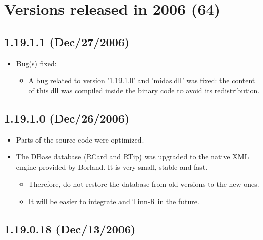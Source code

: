 
\section{Versions released in 2006 (64)}
\subsection{1.19.1.1 (Dec/27/2006)}

\begin{itemize}
  \item Bug(s) fixed:
    \begin{itemize}
      \item A bug related to version '1.19.1.0' and 'midas.dll' was fixed:
        the content of this dll was compiled inside the binary code to avoid
        its redistribution.
    \end{itemize}
\end{itemize}


\subsection{1.19.1.0 (Dec/26/2006)}

\begin{itemize}
  \item Parts of the source code were optimized.
  \item The DBase database (RCard and RTip) was upgraded to the native XML engine
    provided by Borland. It is very small, stable and fast.
    \begin{itemize}
      \item Therefore, do not restore the database from old versions to the new
        ones.
      \item It will be easier to integrate \RR{} and Tinn-R in the future.
    \end{itemize}
\end{itemize}


\subsection{1.19.0.18 (Dec/13/2006)}

